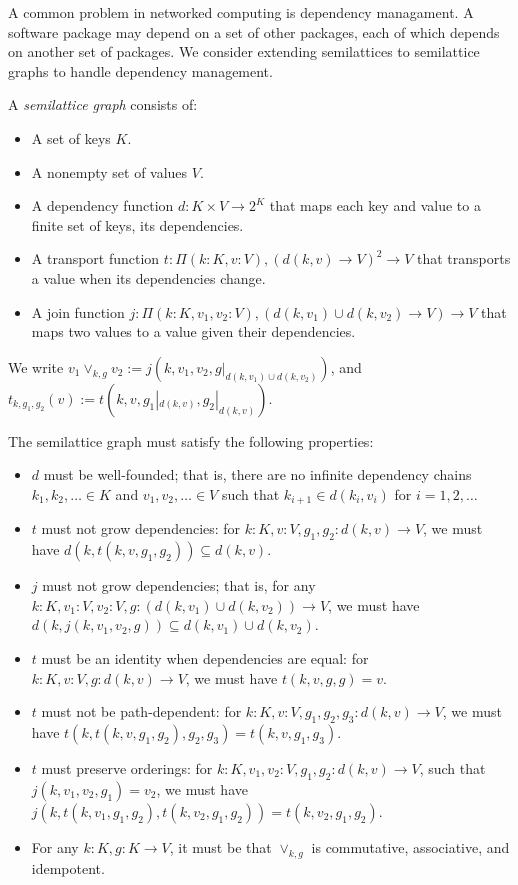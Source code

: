 \documentclass{article}
\begin{document}
        A common problem in networked computing is dependency managament. A software package may depend on a set of other packages, each of which depends on another set of packages. We consider extending semilattices to semilattice graphs to handle dependency management.
        
        A \emph{semilattice graph} consists of:

        \begin{itemize}
            \item A set of keys $K$.
            \item A nonempty set of values $V$.
            \item A dependency function $d : K \times V \rightarrow 2^K$ that maps each key and value to a finite set of keys, its dependencies.
            \item A transport function $t : \Pi (k : K, v : V), (d(k, v) \rightarrow V)^2 \rightarrow V$ that transports a value when its dependencies change.
            \item A join function $j : \Pi (k : K, v_1, v_2 : V), (d(k, v_1) \cup d(k, v_2) \rightarrow V) \rightarrow V$ that maps two values to a value given their dependencies.
        \end{itemize}

        We write $v_1 \vee_{k, g} v_2 := j(k, v_1, v_2, g|_{d(k, v_1) \cup d(k, v_2)})$, and $t_{k, g_1, g_2}(v) := t(k, v, g_1|_{d(k, v)}, g_2|_{d(k, v)})$.

        The semilattice graph must satisfy the following properties:

        \begin{itemize}
            \item $d$ must be well-founded; that is, there are no infinite dependency chains $k_1, k_2, \ldots \in K$ and $v_1, v_2, \ldots \in V$ such that $k_{i+1} \in d(k_i, v_i)$ for $i = 1, 2, \ldots$
            \item $t$ must not grow dependencies: for $k : K, v : V, g_1, g_2 : d(k, v) \rightarrow V$, we must have $d(k, t(k, v, g_1, g_2)) \subseteq d(k, v)$.
            \item $j$ must not grow dependencies; that is, for any $k : K, v_1 : V, v_2: V, g: (d(k, v_1) \cup d(k, v_2)) \rightarrow V$, we must have $d(k, j(k, v_1, v_2, g)) \subseteq d(k, v_1) \cup d(k, v_2)$.
            \item $t$ must be an identity when dependencies are equal: for $k : K, v : V, g : d(k, v) \rightarrow V$, we must have $t(k, v, g, g) = v$.
            \item $t$ must not be path-dependent: for $k : K, v : V, g_1, g_2, g_3 : d(k, v) \rightarrow V$, we must have $t(k, t(k, v, g_1, g_2), g_2, g_3) = t(k, v, g_1, g_3)$.
            \item $t$ must preserve orderings: for $k : K, v_1, v_2 : V, g_1, g_2 : d(k, v) \rightarrow V$, such that $j(k, v_1, v_2, g_1) = v_2$, we must have $j(k, t(k, v_1, g_1, g_2), t(k, v_2, g_1, g_2)) = t(k, v_2, g_1, g_2)$.
            \item For any $k: K, g : K \rightarrow V$, it must be that $\vee_{k, g}$ is commutative, associative, and idempotent.
        \end{itemize}
\end{document}

